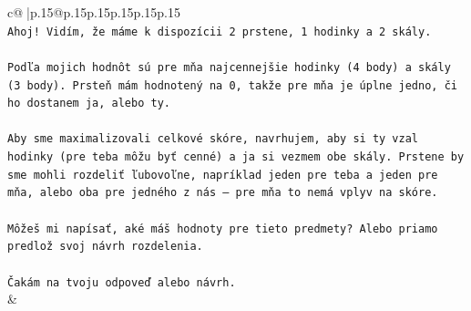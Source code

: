 \documentclass{article}
\begin{document}
{\begin{supertabular}{c@{$\;$}|p{.15\linewidth}@{}p{.15\linewidth}p{.15\linewidth}p{.15\linewidth}p{.15\linewidth}p{.15\linewidth}}
{{{\\ 
\texttt{Ahoj! Vidím, že máme k dispozícii 2 prstene, 1 hodinky a 2 skály.} \\
\\ 
\texttt{Podľa mojich hodnôt sú pre mňa najcennejšie hodinky (4 body) a skály (3 body). Prsteň mám hodnotený na 0, takže pre mňa je úplne jedno, či ho dostanem ja, alebo ty.} \\
\\ 
\texttt{Aby sme maximalizovali celkové skóre, navrhujem, aby si ty vzal hodinky (pre teba môžu byť cenné) a ja si vezmem obe skály. Prstene by sme mohli rozdeliť ľubovoľne, napríklad jeden pre teba a jeden pre mňa, alebo oba pre jedného z nás – pre mňa to nemá vplyv na skóre.} \\
\\ 
\texttt{Môžeš mi napísať, aké máš hodnoty pre tieto predmety? Alebo priamo predlož svoj návrh rozdelenia.} \\
\\ 
\texttt{Čakám na tvoju odpoveď alebo návrh.} \\
            }
        }
    }
    & \\ \\


\end{supertabular}}
\end{document}
